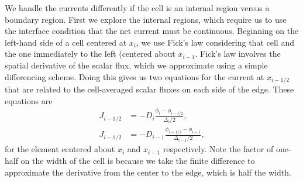 We handle the currents differently if the cell is an internal region versus a boundary region. First we explore the internal regions, which require us to use the interface condition that the net current must be continuous. Beginning on the left-hand side of a cell centered at $x_i$, we use Fick's law considering that cell and the one immediately to the left (centered about $x_{i-1}$. Fick's law involves the spatial derivative of the scalar flux, which we approximate using a simple differencing scheme. Doing this gives us two equations for the current at $x_{i-1/2}$ that are related to the cell-averaged scalar fluxes on each side of the edge. These equations are
\begin{subequations}
\begin{align}
  J_{i-1/2} &= -D_{i}   \frac{ \phi_{i}     - \phi_{i-i/2} }{ \Delta_{i}/2 }, \label{Eq:neutronics_neutronDiffusionFiniteDifference_FicksLawLeftInterface1} \\
  J_{i-1/2} &= -D_{i-1} \frac{ \phi_{i-1/2} - \phi_{i-1}   }{ \Delta_{i-1}/2 },
\end{align}
\end{subequations}
for the element centered about $x_i$ and $x_{i-1}$ respectively. Note the factor of one-half on the width of the cell is because we take the finite difference to approximate the derivative from the center to the edge, which is half the width.

